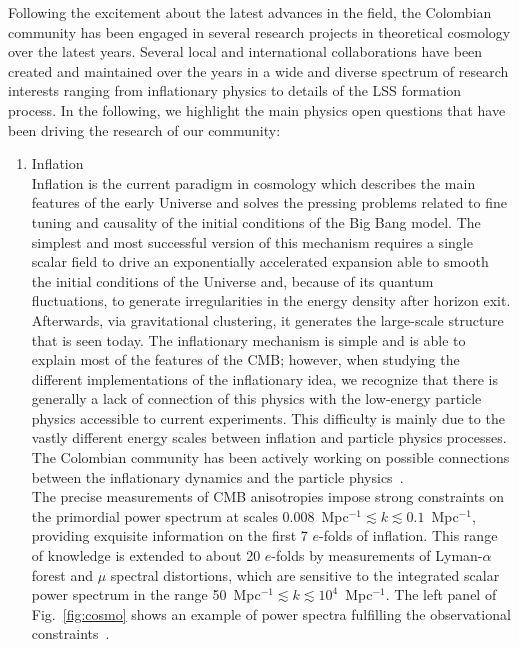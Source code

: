 \documentclass[a4paper,11pt]{article}
\begin{document}
Following the excitement about the latest advances in the field, the Colombian community has been engaged in several research projects in theoretical cosmology over the latest years. Several local and international collaborations have been created and maintained over the years in a wide and diverse spectrum of research interests ranging from inflationary physics to details of the LSS formation process. In the following, we highlight the main physics open questions that have been driving the research of our community:
\begin{enumerate}
\item 
Inflation\\
Inflation is the current paradigm in cosmology which describes the main features of the early Universe and solves the pressing problems related to fine tuning and causality of the initial conditions of the Big Bang model. The simplest and most successful version of this mechanism requires a single scalar field to drive an exponentially accelerated expansion able to smooth the initial conditions of the Universe and, because of its quantum fluctuations, to generate irregularities in the energy density after horizon exit. Afterwards, via gravitational clustering, it generates the large-scale structure that is seen today. The inflationary mechanism is simple and is able to explain most of the features of the CMB; however, when studying the different implementations of the inflationary idea, we recognize that there is generally a lack of connection of this physics with the low-energy particle physics accessible to current experiments. This difficulty is mainly due to the vastly different energy scales between inflation and particle physics processes.
The Colombian community has been actively working on possible connections between the inflationary dynamics and the particle physics~\cite{Dimopoulos:2004yb,Rodriguez:2004yc,Nieto:2016gnp,Bernal:2018hjm, Almeida:2018oid, Bernal:2020bfj, Bernal:2020qyu, Almeida:2020kaq}.\\
The precise measurements of CMB anisotropies impose strong constraints on the primordial power spectrum at scales 0.008~Mpc$^{-1}\lesssim k \lesssim 0.1$~Mpc$^{-1}$, providing exquisite information on the first 7 $e$-folds of inflation. This range of knowledge is extended to about 20 $e$-folds by measurements of Lyman-$\alpha$ forest and $\mu$ spectral distortions, which are sensitive to the integrated scalar power spectrum in the range 50~Mpc$^{-1}\lesssim k\lesssim 10^4$~Mpc$^{-1}$. The left panel of
Fig.~\ref{fig:cosmo} shows an example of power spectra fulfilling the observational constraints~\cite{Almeida:2020kaq}.

\end{enumerate}
\end{document}
